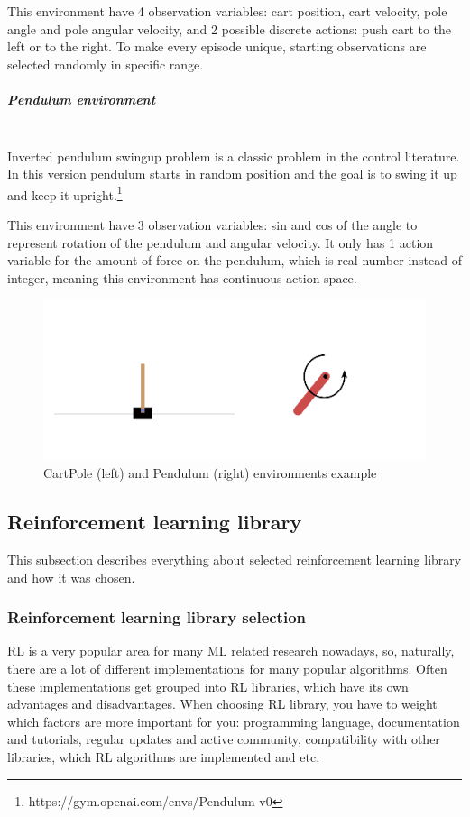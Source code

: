 \documentclass[12pt, a4paper]{article}
\begin{document}
This environment have 4 observation variables: cart position, cart velocity, pole angle and pole angular velocity, and 2 possible discrete actions: push cart to the left or to the right. To make every episode unique, starting observations are selected randomly in specific range.

\subparagraph{Pendulum environment}\mbox{}\\

Inverted pendulum swingup problem is a classic problem in the control literature. In this version pendulum starts in random position and the goal is to swing it up and keep it upright.\footnote{https://gym.openai.com/envs/Pendulum-v0} 

This environment have 3 observation variables: sin and cos of the angle to represent rotation of the pendulum and angular velocity. It only has 1 action variable for the amount of force on the pendulum, which is real number instead of integer, meaning this environment has continuous action space.

\begin{figure}[H]
    \centering
    \includegraphics[width=.8\linewidth]{env-examples.png}
    \caption{CartPole (left) and Pendulum (right) environments example}
    \label{CartpolePendulumExample}
\end{figure}

\subsection{Reinforcement learning library}

This subsection describes everything about selected reinforcement learning library and how it was chosen.

\subsubsection{Reinforcement learning library selection}

RL is a very popular area for many ML related research nowadays, so, naturally, there are a lot of different implementations for many popular algorithms. Often these implementations get grouped into RL libraries, which have its own advantages and disadvantages. When choosing RL library, you have to weight which factors are more important for you: programming language, documentation and tutorials, regular updates and active community, compatibility with other libraries, which RL algorithms are implemented and etc.
\end{document}
